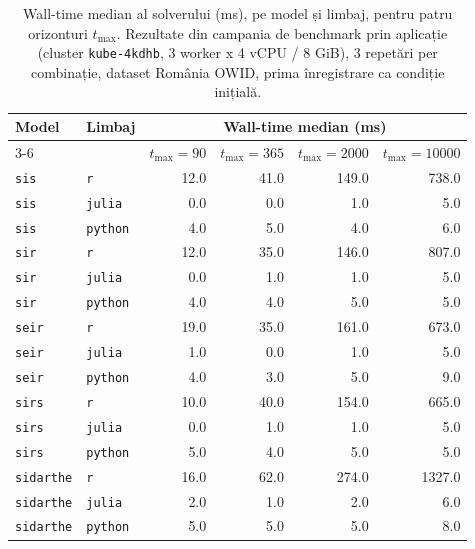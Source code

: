 \begin{table}[!htbp]
\centering
\caption[Wall-time median solver]{Wall-time median al solverului (ms), pe model și limbaj, pentru patru orizonturi $t_{\max}$. Rezultate din campania de benchmark prin aplicație (cluster \texttt{kube-4kdhb}, 3 worker x 4 vCPU / 8 GiB), 3 repetări per combinație, dataset România OWID, prima înregistrare ca condiție inițială.}
\label{tab:bench_wall_time}
\small
\begin{tabularx}{\textwidth}{l l rrrr}
\toprule
\textbf{Model} & \textbf{Limbaj} & \multicolumn{4}{c}{\textbf{Wall-time median (ms)}} \\
\cmidrule(l){3-6}
 & & $t_{\max}=90$ & $t_{\max}=365$ & $t_{\max}=2000$ & $t_{\max}=10000$ \\
\midrule
\texttt{sis} & \texttt{r} & 12.0 & 41.0 & 149.0 & 738.0 \\
\texttt{sis} & \texttt{julia} & 0.0 & 0.0 & 1.0 & 5.0 \\
\texttt{sis} & \texttt{python} & 4.0 & 5.0 & 4.0 & 6.0 \\
\midrule
\texttt{sir} & \texttt{r} & 12.0 & 35.0 & 146.0 & 807.0 \\
\texttt{sir} & \texttt{julia} & 0.0 & 1.0 & 1.0 & 5.0 \\
\texttt{sir} & \texttt{python} & 4.0 & 4.0 & 5.0 & 5.0 \\
\midrule
\texttt{seir} & \texttt{r} & 19.0 & 35.0 & 161.0 & 673.0 \\
\texttt{seir} & \texttt{julia} & 1.0 & 0.0 & 1.0 & 5.0 \\
\texttt{seir} & \texttt{python} & 4.0 & 3.0 & 5.0 & 9.0 \\
\midrule
\texttt{sirs} & \texttt{r} & 10.0 & 40.0 & 154.0 & 665.0 \\
\texttt{sirs} & \texttt{julia} & 0.0 & 1.0 & 1.0 & 5.0 \\
\texttt{sirs} & \texttt{python} & 5.0 & 4.0 & 5.0 & 5.0 \\
\midrule
\texttt{sidarthe} & \texttt{r} & 16.0 & 62.0 & 274.0 & 1327.0 \\
\texttt{sidarthe} & \texttt{julia} & 2.0 & 1.0 & 2.0 & 6.0 \\
\texttt{sidarthe} & \texttt{python} & 5.0 & 5.0 & 5.0 & 8.0 \\
\bottomrule
\end{tabularx}
\end{table}
